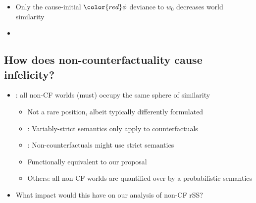 \begin{frame}[t]
	\subsectionpage\vskip 9pt
	\begin{itemize}
        \item<1->	Only the cause-initial ${\color{red}\phi}$ deviance to $w_0$ decreases world similarity
	\end{itemize}\vspace{-5mm}
	\begin{figure}[ht!]
\centering

\label{fig:causal}
\end{figure}\vspace{-7.5mm}
	\begin{itemize}
        \item<4->  
	\end{itemize}
\end{frame}

\subsection{How does non-counterfactuality cause infelicity?}
\begin{frame}[t]
\subsectionpage\vskip 9pt
    \begin{itemize}
        \item<2-> \citet{krassnig2022ReverseSobel}: all non-CF worlds (must) occupy the same sphere of similarity\vskip 4.5pt
            \begin{itemize}
                \item<3-> Not a rare position, albeit typically differently formulated\vskip 4.5pt
                \item<4-> \citet{Lewis1973}: Variably-strict semantics only apply to counterfactuals
                \item<5-> \citet{Lewis1973}: Non-counterfactuals might use strict semantics\vskip 4.5pt
                \item<6-> Functionally equivalent to our proposal\vskip 9pt
                \item<7-> Others: all non-CF worlds are quantified over by a probabilistic semantics \citep{adams1966probability,Edgington1995,Berto2021}
            \end{itemize}\vskip 18pt
        \item<8-> What impact would this have on our analysis of non-CF rSS?
    \end{itemize}
\end{frame}

